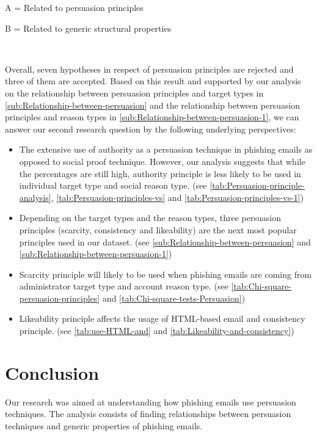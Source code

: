 {\footnotesize{}A = Related to persuasion principles}{\footnotesize \par}

{\footnotesize{}B = Related to generic structural properties}{\footnotesize \par}

\  

Overall, seven hypotheses in respect of persuasion principles are
rejected and three of them are accepted. Based on this result and
supported by our analysis on the relationship between persuasion principles
and target types in \autoref{sub:Relationship-between-persuasion}
and the relationship between persuasion principles and reason types
in \autoref{sub:Relationship-between-persuasion-1}, we can answer
our second research question by the following underlying perspectives: 
\begin{itemize}
\item The extensive use of authority as a persuasion technique in phishing
emails as opposed to social proof technique. However, our analysis
suggests that while the percentages are still high, authority principle
is less likely to be used in individual target type and social reason
type. (see \autoref{tab:Persuasion-principle-analysis}, \autoref{tab:Persuasion-principles-vs}
and \autoref{tab:Persuasion-principles-vs-1})
\item Depending on the target types and the reason types, three persuasion
principles (scarcity, consistency and likeability) are the next most
popular principles used in our dataset. (see \autoref{sub:Relationship-between-persuasion}
and \autoref{sub:Relationship-between-persuasion-1})
\item Scarcity principle will likely to be used when phishing emails are
coming from administrator target type and account reason type. (see
\autoref{tab:Chi-square-persuasion-principles} and \autoref{tab:Chi-square-tests-Persuasion})
\item Likeability principle affects the usage of HTML-based email and consistency
principle. (see \autoref{tab:use-HTML-and} and \autoref{tab:Likeability-and-consistency})
\end{itemize}

\section{Conclusion}

Our research was aimed at understanding how phishing emails use persuasion
techniques. The analysis consists of finding relationships between
persuasion techniques and generic properties of phishing emails.

